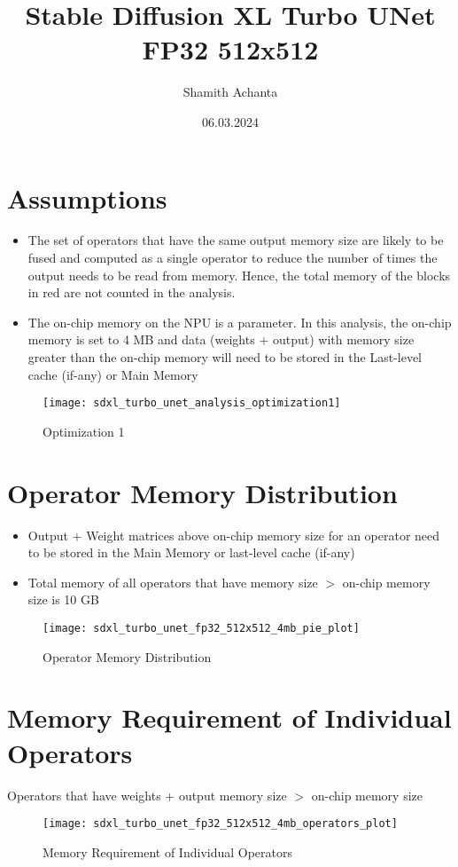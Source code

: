 \documentclass[12pt, letter, landscape]{article}
\begin{document}
\title{Stable Diffusion XL Turbo UNet FP32 512x512}
\author{Shamith Achanta}
\date{06.03.2024}

\maketitle

\section{Assumptions}
\begin{itemize}
	\item The set of operators that have the same output memory size are likely to be fused and computed as a single operator to reduce the number of times the output needs to be read from memory. Hence, the total memory of the blocks in red are not counted in the analysis.
	\item The on-chip memory on the NPU is a parameter. In this analysis, the on-chip memory is set to 4 MB and data (weights + output) with memory size greater than the on-chip memory will need to be stored in the Last-level cache (if-any) or Main Memory
\end{itemize}

\begin{figure}[h]
\caption{Optimization 1}
\centering
\texttt{[image: sdxl\_turbo\_unet\_analysis\_optimization1]}
\end{figure}

\clearpage

\section{Operator Memory Distribution}
\begin{itemize}
	\item Output + Weight matrices above on-chip memory size for an operator need to be stored in the Main Memory or last-level cache (if-any)
	\item Total memory of all operators that have memory size $>$ on-chip memory size is 10 GB
\end{itemize}

\begin{figure}[h]
\caption{Operator Memory Distribution}
\centering
\texttt{[image: sdxl\_turbo\_unet\_fp32\_512x512\_4mb\_pie\_plot]}
\end{figure}

\clearpage

\section{Memory Requirement of Individual Operators}
Operators that have weights + output memory size $>$ on-chip memory size

\begin{figure}[h]
\caption{Memory Requirement of Individual Operators}
\centering
\texttt{[image: sdxl\_turbo\_unet\_fp32\_512x512\_4mb\_operators\_plot]}
\end{figure}

\clearpage
\end{document}

